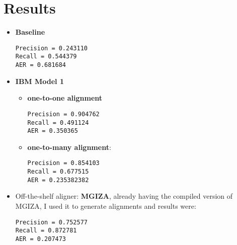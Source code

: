 \documentclass{article}[a4paper]
\begin{document}
\section{Results}
\begin{itemize}
    \item \textbf{Baseline}
        \begin{Verbatim}
Precision = 0.243110
Recall = 0.544379
AER = 0.681684
        \end{Verbatim}
    \item \textbf{IBM Model 1}
        \begin{itemize}
        \item \textbf{one-to-one alignment}
            \begin{Verbatim}
Precision = 0.904762
Recall = 0.491124
AER = 0.350365
            \end{Verbatim}
        \item \textbf{one-to-many alignment}: 
            \begin{Verbatim}
Precision = 0.854103
Recall = 0.677515
AER = 0.235382382
            \end{Verbatim}
        \end{itemize}
    \item Off-the-shelf aligner: \textbf{MGIZA}, already having the compiled version of MGIZA, I used it to generate alignments and results  were:
    \begin{Verbatim}
Precision = 0.752577
Recall = 0.872781
AER = 0.207473
    \end{Verbatim}
    
\end{itemize}
\end{document}
